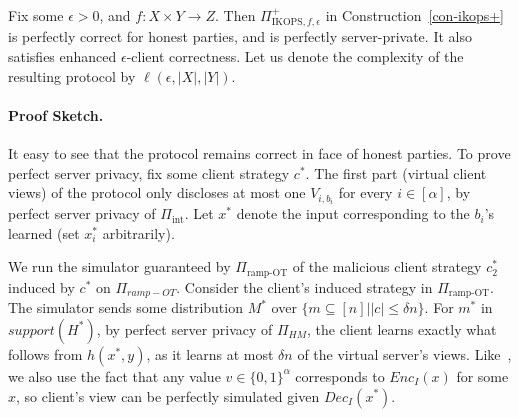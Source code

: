 \documentclass{llncs}
\newcommand{\INT}{\Pi_{\operatorname{int}}}
\begin{document}
\begin{lemma}\label{thm-pcl}
	Fix some $\epsilon>0$, and $f:X\times Y\rightarrow Z$. Then $\Pi^+_{\text{IKOPS},f,\epsilon}$ in
	Construction~\ref{con-ikops+} is perfectly correct for honest parties, and is perfectly server-private. It also satisfies enhanced $\epsilon$-client correctness. Let us denote the complexity of the resulting protocol by $\ell(\epsilon,|X|,|Y|)$.
\end{lemma}



\paragraph{Proof Sketch.} It easy to see that the protocol remains correct in face of honest parties. 
To prove  perfect server privacy, fix some client strategy $c^*$. The first part (virtual client views) of the protocol only discloses at most one $V_{i,b_i}$ for every $i\in[\alpha]$, by perfect server privacy of $\INT$. Let $x^*$ denote the input corresponding to the $b_i$'s learned (set $x^*_i$ arbitrarily).

We run the simulator guaranteed by $\Pi_{\text{ramp-OT}}$ of the malicious client strategy $c^*_2$ induced by $c^*$ on $\Pi_{ramp-OT}$. 
Consider the client's induced strategy in $\Pi_{\text{ramp-OT}}$. The simulator sends some distribution $M^*$ over $\{m\subseteq [n]||c|\leq \delta n\}$.
For $m^*$ in $support(H^*)$, by perfect server privacy of $\Pi_{HM}$, the client learns exactly what follows from $h(x^*,y)$, as it learns at most $\delta n$ of the virtual server's views. Like~\cite{IKOPS11}, we also use the fact that any value $v\in \{0,1\}^{\alpha}$ corresponds to $Enc_I(x)$ for some $x$, so client's view can be perfectly simulated given $Dec_I(x^*)$.
\end{document}
